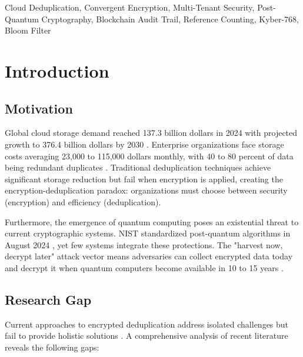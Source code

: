 \documentclass[conference]{IEEEtran}
\begin{document}
\begin{IEEEkeywords}
Cloud Deduplication, Convergent Encryption, Multi-Tenant Security, Post-Quantum Cryptography, Blockchain Audit Trail, Reference Counting, Kyber-768, Bloom Filter
\end{IEEEkeywords}

\section{Introduction}

\subsection{Motivation}
Global cloud storage demand reached 137.3 billion dollars in 2024 with projected growth to 376.4 billion dollars by 2030 \cite{statista2024}. Enterprise organizations face storage costs averaging 23,000 to 115,000 dollars monthly, with 40 to 80 percent of data being redundant duplicates \cite{idc2023}. Traditional deduplication techniques achieve significant storage reduction but fail when encryption is applied, creating the encryption-deduplication paradox: organizations must choose between security (encryption) and efficiency (deduplication).

Furthermore, the emergence of quantum computing poses an existential threat to current cryptographic systems. NIST standardized post-quantum algorithms in August 2024 \cite{nist2024pqc}, yet few systems integrate these protections. The "harvest now, decrypt later" attack vector means adversaries can collect encrypted data today and decrypt it when quantum computers become available in 10 to 15 years \cite{mosca2018quantum}.

\subsection{Research Gap}
Current approaches to encrypted deduplication address isolated challenges but fail to provide holistic solutions \cite{chen2024survey}. A comprehensive analysis of recent literature reveals the following gaps:
\end{document}
